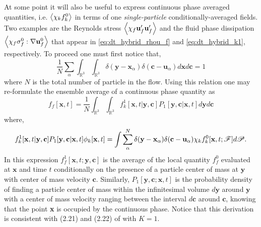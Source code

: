 At some point it will also be useful to express continuous phase averaged quantities, i.e. $\left<\chi_k f_k^0\right>$  in terms of one  \textit{single-particle} conditionally-averaged fields. 
Two examples are the Reynolds stress $\left<\chi_f \textbf{u}_f'\textbf{u}_f'\right>$ and the fluid phase dissipation $\left<\chi_f\sigma_f^0:\mathbf{\nabla} \textbf{u}_f^0\right>$ that appear in \ref{eq:dt_hybrid_rhou_f} and \ref{eq:dt_hybrid_k1}, respectively.  
To proceed one must first notice that, 
\begin{equation}
    \frac{1}{N}\sum_\alpha 
    \int_{\mathbb{R}^3}
    \int_{\mathbb{R}^3}
    \delta(\textbf{y}-\textbf{x}_\alpha)
    \delta(\textbf{c}-\textbf{u}_\alpha)
    d\textbf{x}
    d\textbf{c}
    = 1
\end{equation}
where $N$ is the total number of particle in the flow. 
Using this relation one may re-formulate the ensemble average of a continuous phase quantity as 
\begin{equation}
    f_f[\textbf{x},t]
    = 
    \frac{1}{N}
    \int_{\mathbb{R}^3}
    \int_{\mathbb{R}^3}
    f_k^1[\textbf{x},t|\textbf{y},\textbf{c}]  P_1[\textbf{y},\textbf{c}|\textbf{x},t] 
    d\textbf{y} 
    d\textbf{c}
    \label{eq:conditional_averaged_fluid}
\end{equation}
where,
\begin{equation*}
    f_k^1[\textbf{x},t|\textbf{y},\textbf{c}] P_1[\textbf{y},\textbf{c}|\textbf{x},t] \phi_k[\textbf{x},t]
    =     
    \int
    \sum_\alpha^N 
    \delta(\textbf{y}-\textbf{x}_\alpha)
     \delta(\textbf{c}-\textbf{u}_\alpha)
    \chi_k
    f^0_k[\textbf{x},t;\mathscr{F}]
    d\mathscr{P}.
\end{equation*}
In this expression $f_f^1[\textbf{x},t;\textbf{y},\textbf{c}]$ is the average of the local quantity $f_f^0$ evaluated at $\textbf{x}$ and time $t$ conditionally on the presence of a particle center of mass at $\textbf{y}$ with center of mass velocity $\textbf{c}$. 
Similarly, $P_1[\textbf{y},\textbf{c};\textbf{x},t]$ is the probability density of finding a particle center of mass within the infinitesimal volume $d\textbf{y}$ around $\textbf{y}$ with a center of mass velocity ranging between the interval $d\textbf{c}$ around $\textbf{c}$, knowing that the point \textbf{x} is occupied by the continuous phase. 
Notice that this derivation is consistent with (2.21) and (2.22) of \citet{zhang1994ensemble} with $K = 1$. 

